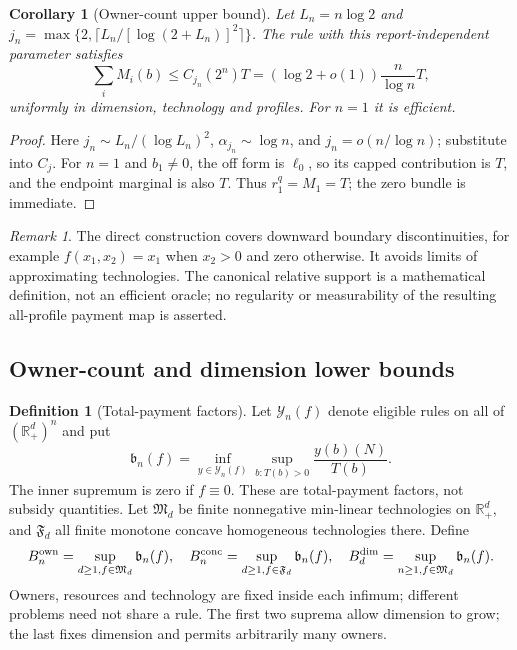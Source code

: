 \documentclass[11pt]{article}
\newtheorem{corollary}[theorem]{Corollary}
\theoremstyle{definition}\newtheorem{definition}[theorem]{Definition}
\theoremstyle{remark}\newtheorem{remark}[theorem]{Remark}
\newcommand{\R}{\mathbb R}
\begin{document}
\begin{corollary}[Owner-count upper bound]\label{ext:cor:owner-upper}
Let $L_n=n\log2$ and $j_n=\max\{2,\lceil L_n/[\log(2+L_n)]^2\rceil\}$.
The rule with this report-independent parameter satisfies
\[
 \sum_iM_i(b)\le C_{j_n}(2^n)T
   =(\log2+o(1))\frac n{\log n}T,
\]
uniformly in dimension, technology and profiles.  For $n=1$ it is efficient.
\end{corollary}
\begin{proof}
Here $j_n\sim L_n/(\log L_n)^2$, $\alpha_{j_n}\sim\log n$, and
$j_n=o(n/\log n)$; substitute into $C_j$.
For $n=1$ and $b_1\ne0$, the off form is $\ell_0$, so its capped
contribution is $T$, and the endpoint marginal is also $T$.
Thus $r_1^q=M_1=T$; the zero bundle is immediate.
\end{proof}
\begin{remark}\label{ext:rem:direct}
The direct construction covers downward boundary discontinuities, for example
$f(x_1,x_2)=x_1$ when $x_2>0$ and zero otherwise.
It avoids limits of approximating technologies.  The canonical relative
support is a mathematical definition, not an efficient oracle; no regularity
or measurability of the resulting all-profile payment map is asserted.
\end{remark}

\subsection{Owner-count and dimension lower bounds}
\begin{definition}[Total-payment factors]\label{ext:def:factors}
Let $\mathcal Y_n(f)$ denote eligible rules on all of $(\R_+^d)^n$ and put
\[
 \mathfrak b_n(f)=\inf_{y\in\mathcal Y_n(f)}\sup_{b:T(b)>0}\frac{y(b)(N)}{T(b)}.
\]
The inner supremum is zero if $f\equiv0$.  These are total-payment factors,
not subsidy quantities.  Let $\mathfrak M_d$ be finite nonnegative min-linear
technologies on $\R_+^d$, and $\mathfrak F_d$ all finite monotone concave
homogeneous technologies there.  Define
\[
 B_n^{\rm own}=\sup_{d\ge1,f\in\mathfrak M_d}\mathfrak b_n(f),\quad
 B_n^{\rm conc}=\sup_{d\ge1,f\in\mathfrak F_d}\mathfrak b_n(f),\quad
 B_d^{\rm dim}=\sup_{n\ge1,f\in\mathfrak M_d}\mathfrak b_n(f).
\]
Owners, resources and technology are fixed inside each infimum; different
problems need not share a rule.  The first two suprema allow dimension to
grow; the last fixes dimension and permits arbitrarily many owners.
\end{definition}
\end{document}

